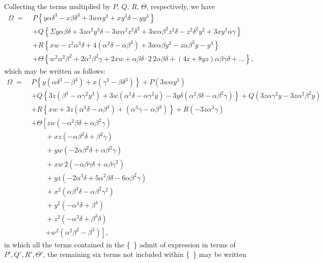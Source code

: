 \documentclass[11pt]{article}
\begin{document}
Collecting the terms multiplied by $P$, $Q$, $R$, $\Theta$, respectively, we have
\begin{align*}
\Omega \;=\; & P\!\left\{y\alpha\delta^3 - x\beta\delta^3 + 3w\alpha y^3 + xy^3\delta - yy^3\right\}\\
& + Q\!\left\{\Sigma y\alpha\beta\delta + 3z\alpha^2 y^3\delta - 3w\alpha^2 z^2\delta^2 + 3w\alpha\beta^2 z^2\delta - z^2\delta^2 y^2 + 3xy^3\alpha\gamma\right\}\\
& + R\!\left\{xw - z^2\alpha^3\delta + 4(\alpha^3\delta - \alpha\beta^3) + 3w\alpha\beta y^3 - z\alpha\beta^3 y - y^3\right\}\\
& + \Theta\!\left\{w^2\alpha^2\beta^2 + 2\alpha^2\beta^2\gamma + 2xw + \alpha\beta\delta\cdot 2\,2\alpha\beta\delta + (4z + 8yz)\alpha\beta\gamma\delta + \ldots\right\},
\end{align*}
which may be written as follows:
\begin{align*}
\Omega \;=\; & P\!\left\{y(\alpha\delta^3 - \beta^3) + x(\gamma^3 - \beta\delta^3)\right\} + P(3w\alpha y^3)\\
& + Q\!\left\{3z(\beta^3 - \alpha\gamma^2 y^3) + 3w(\alpha^2\delta - \alpha\gamma^2 y) - 3y\delta(\alpha^2\beta\delta - \alpha\beta^2\gamma)\right\} + Q(3z\alpha\gamma^2 y - 3z\alpha^2\beta^2 y)\\
& + R\!\left\{xw + 3z(\alpha^3\delta - \alpha\beta^3) + (\alpha^3\gamma - \alpha\beta^3)\right\} + R(-3z\alpha^3\gamma)\\
& + \Theta\!\left[zw(-\alpha^2\beta\delta + \alpha\beta^2\gamma)\right.\\
& \qquad + xz(-\alpha\beta^2\delta + \beta^2\gamma)\\
& \qquad + yw(-2\alpha\beta^2\delta + \alpha\beta^2\gamma)\\
& \qquad + xw\,2(-\alpha\beta\gamma\delta + \alpha\beta\gamma^2)\\
& \qquad + yz(-2\alpha^3\delta + 5\alpha^2\beta\delta - 6\alpha\beta^2\gamma)\\
& \qquad + x^2(\alpha\beta^3\delta - \alpha\beta^2\gamma^2)\\
& \qquad + y^2(-\alpha^4\delta + \beta^4)\\
& \qquad + z^2(-\alpha^3\delta + \beta^3\delta)\\
& \qquad \left. + w^2(\alpha^2\beta^2 - \beta^3)\right],
\end{align*}
in which all the terms contained in the \{\ \} admit of expression in terms of $P', Q', R', \Theta'$, the remaining six terms not included within \{\ \} may be written
\end{document}
